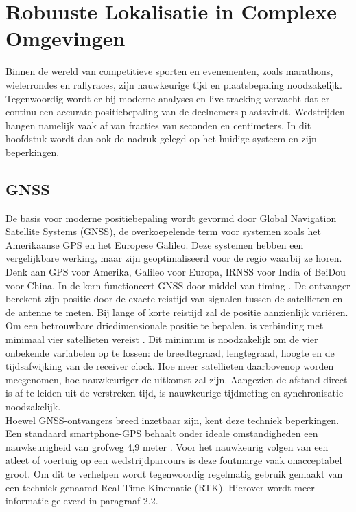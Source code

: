 
\section{Robuuste Lokalisatie in Complexe Omgevingen}
Binnen de wereld van competitieve sporten en evenementen, zoals marathons, wielerrondes en rallyraces, zijn nauwkeurige tijd en plaatsbepaling noodzakelijk. Tegenwoordig wordt er bij moderne analyses en live tracking verwacht dat er continu een accurate positiebepaling van de deelnemers plaatsvindt. Wedstrijden hangen namelijk vaak af van fracties van seconden en centimeters. In dit hoofdstuk wordt dan ook de nadruk gelegd op het huidige systeem en zijn beperkingen.


\subsection{GNSS}

De basis voor moderne positiebepaling wordt gevormd door Global Navigation Satellite Systems (GNSS), de overkoepelende term voor systemen zoals het Amerikaanse GPS en het Europese Galileo. Deze systemen hebben een vergelijkbare werking, maar zijn geoptimaliseerd voor de regio waarbij ze horen. Denk aan GPS voor Amerika, Galileo voor Europa, IRNSS voor India of BeiDou voor China. In de kern functioneert GNSS door middel van timing \cite{GNSSConstellations2026}. De ontvanger berekent zijn positie door de exacte reistijd van signalen tussen de satellieten en de antenne te meten. Bij lange of korte reistijd zal de positie aanzienlijk variëren. Om een betrouwbare driedimensionale positie te bepalen, is verbinding met minimaal vier satellieten vereist \cite{novatel_computation}. Dit minimum is noodzakelijk om de vier onbekende variabelen op te lossen: de breedtegraad, lengtegraad, hoogte en de tijdsafwijking van de receiver clock. Hoe meer satellieten daarbovenop worden meegenomen, hoe nauwkeuriger de uitkomst zal zijn. Aangezien de afstand direct is af te leiden uit de verstreken tijd, is nauwkeurige tijdmeting en synchronisatie noodzakelijk. \\ 

Hoewel GNSS-ontvangers breed inzetbaar zijn, kent deze techniek beperkingen. Een standaard smartphone-GPS behaalt onder ideale omstandigheden een nauwkeurigheid van grofweg 4,9 meter \cite{gpsgov2026accuracy}. Voor het nauwkeurig volgen van een atleet of voertuig op een wedstrijdparcours is deze foutmarge vaak onacceptabel groot. Om dit te verhelpen wordt tegenwoordig regelmatig gebruik gemaakt van een techniek genaamd Real-Time Kinematic (RTK). Hierover wordt meer informatie geleverd in paragraaf 2.2.

